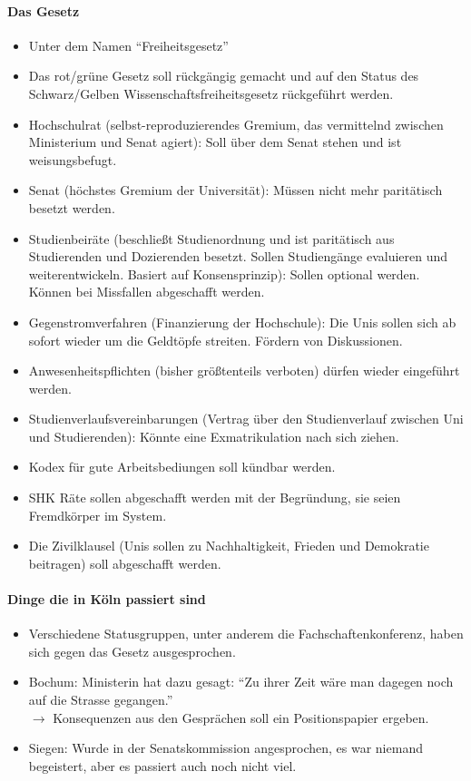     \paragraph{Das Gesetz}
      \begin{itemize}
        \item Unter dem Namen ``Freiheitsgesetz''
        \item Das rot/grüne Gesetz soll rückgängig gemacht und auf den Status des Schwarz/Gelben Wissenschaftsfreiheitsgesetz rückgeführt werden.
        \item Hochschulrat (selbst-reproduzierendes Gremium, das vermittelnd zwischen Ministerium und Senat agiert): Soll über dem Senat stehen und ist weisungsbefugt.
        \item Senat (höchstes Gremium der Universität): Müssen nicht mehr paritätisch besetzt werden.
        \item Studienbeiräte (beschließt Studienordnung und ist paritätisch aus Studierenden und Dozierenden besetzt. Sollen Studiengänge evaluieren und weiterentwickeln. Basiert auf Konsensprinzip): Sollen optional werden. Können bei Missfallen abgeschafft werden.
        \item Gegenstromverfahren (Finanzierung der Hochschule): Die Unis sollen sich ab sofort wieder um die Geldtöpfe streiten. Fördern von Diskussionen.
        \item Anwesenheitspflichten (bisher größtenteils verboten) dürfen wieder eingeführt werden.
        \item Studienverlaufsvereinbarungen (Vertrag über den Studienverlauf zwischen Uni und Studierenden): Könnte eine Exmatrikulation nach sich ziehen.
        \item Kodex für gute Arbeitsbediungen soll kündbar werden.
        \item SHK Räte sollen abgeschafft werden mit der Begründung, sie seien Fremdkörper im System.
        \item Die Zivilklausel (Unis sollen zu Nachhaltigkeit, Frieden und Demokratie beitragen) soll abgeschafft werden.
      \end{itemize}

    \paragraph{Dinge die in Köln passiert sind}
      \begin{itemize}
        \item Verschiedene Statusgruppen, unter anderem die Fachschaftenkonferenz, haben sich gegen das Gesetz ausgesprochen.
        \item Bochum: Ministerin hat dazu gesagt: ``Zu ihrer Zeit wäre man dagegen noch auf die Strasse gegangen.'' \\
          $\rightarrow$ Konsequenzen aus den Gesprächen soll ein Positionspapier ergeben.
        \item Siegen: Wurde in der Senatskommission angesprochen, es war niemand begeistert, aber es passiert auch noch nicht viel.
      \end{itemize}

